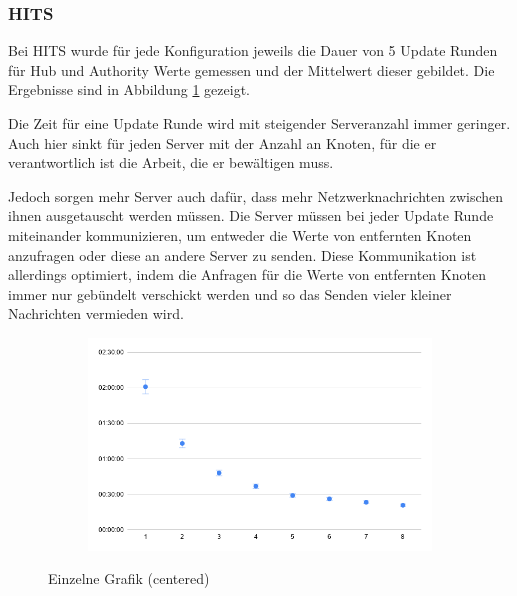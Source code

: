 \subsubsection{HITS}

Bei HITS wurde für jede Konfiguration jeweils die Dauer von 5 Update Runden für Hub und Authority Werte gemessen und der Mittelwert dieser gebildet. Die Ergebnisse sind in Abbildung \ref{eval:hits} gezeigt.

Die Zeit für eine Update Runde wird mit steigender Serveranzahl immer geringer. Auch hier sinkt für jeden Server mit der Anzahl an Knoten, für die er verantwortlich ist die Arbeit, die er bewältigen muss.

Jedoch sorgen mehr Server auch dafür, dass mehr Netzwerknachrichten zwischen ihnen ausgetauscht werden müssen.
Die Server müssen bei jeder Update Runde miteinander kommunizieren, um entweder die Werte von entfernten Knoten anzufragen oder diese an andere Server zu senden. 
Diese Kommunikation ist allerdings optimiert, indem die Anfragen für die Werte von entfernten Knoten immer nur gebündelt verschickt werden und so das Senden vieler kleiner Nachrichten vermieden wird.



\begin{figure}
  \centering
  \begin{subfigure}[b]{1.0\textwidth}
    \includegraphics[width=1.0\linewidth]{img/eval_hits.png}
  \end{subfigure}
  \caption{Einzelne Grafik (centered)}
  \label{eval:hits}
\end{figure}
